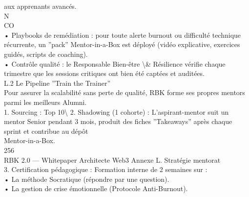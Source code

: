 \documentclass[12pt,landscape,a4paper]{article}
\begin{document}
aux apprenants avancés.\\
\vspace{0.5em}
\vspace{0.5em}
N\\
CO\\
• Playbooks de remédiation : pour toute alerte burnout ou difficulté technique récurrente, un ”pack” Mentor-in-a-Box est déployé (vidéo explicative, exercices\\
guidés, scripts de coaching).\\
\vspace{0.5em}
• Contrôle qualité : le Responsable Bien-être \textbackslash{}& Résilience vérifie chaque trimestre que les sessions critiques ont bien été captées et auditées.\\
\vspace{0.5em}
\vspace{0.5em}
\vspace{0.5em}
L.2 Le Pipeline ”Train the Trainer”\\
Pour assurer la scalabilité sans perte de qualité, RBK forme ses propres mentors parmi les meilleurs Alumni.\\
\vspace{0.5em}
1. Sourcing : Top 10\textbackslash{}%
\vspace{0.5em}
2. Shadowing (1 cohorte) : L’aspirant-mentor suit un mentor Senior pendant 3 mois, produit des fiches ”Takeaways” après chaque sprint et contribue au dépôt\\
Mentor-in-a-Box.\\
\vspace{0.5em}
\vspace{0.5em}
256\\
RBK 2.0 — Whitepaper Architecte Web3                                                                                               Annexe L. Stratégie mentorat\\
\vspace{0.5em}
\vspace{0.5em}
3. Certification pédagogique : Formation interne de 2 semaines sur :\\
\vspace{0.5em}
• La méthode Socratique (répondre par une question).\\
\vspace{0.5em}
• La gestion de crise émotionnelle (Protocole Anti-Burnout).\\
\vspace{0.5em}
\end{document}
